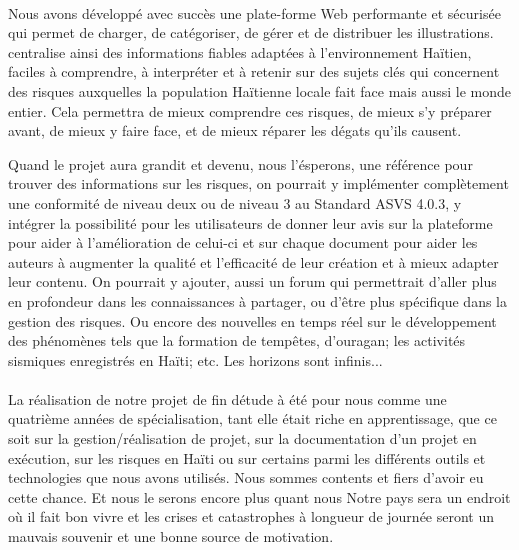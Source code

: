 	\paragraph{} Nous avons d\'evelopp\'e avec succ\`es une plate-forme Web performante et s\'ecuris\'ee qui permet de charger, de cat\'egoriser, de g\'erer et de distribuer les illustrations. \projectName centralise ainsi des informations fiables adapt\'ees \`a l'environnement Ha\"itien, faciles \`a comprendre, \`a interpr\'eter et \`a retenir sur des sujets cl\'es qui concernent des risques auxquelles la population Ha\"itienne locale fait face mais aussi le monde entier. Cela permettra de mieux comprendre ces risques, de mieux s'y pr\'eparer avant, de mieux y faire face, et de mieux r\'eparer les d\'egats qu'ils causent.\par
	\noindent Quand le projet aura grandit et devenu, nous l'\'esperons, une r\'ef\'erence pour trouver des informations sur les risques, on pourrait y impl\'ementer compl\`etement une conformit\'e de niveau deux ou de niveau 3 au Standard ASVS 4.0.3,  y int\'egrer la possibilit\'e pour les utilisateurs de donner leur avis sur la plateforme pour aider \`a l'am\'elioration de celui-ci et sur chaque document pour aider les auteurs \`a augmenter la qualit\'e et l'efficacit\'e de leur cr\'eation et \`a mieux adapter leur contenu. On pourrait y ajouter, aussi un forum qui permettrait d'aller plus en profondeur dans les connaissances \`a partager, ou d'\^etre plus sp\'ecifique dans la gestion des risques. Ou encore des nouvelles en temps r\'eel sur le d\'eveloppement des ph\'enom\`enes tels que la formation de temp\^etes, d'ouragan; les activit\'es sismiques enregistr\'es en Ha\"iti; etc. Les horizons sont infinis...
	\vspace{15pt}
	
	\paragraph{}La r\'ealisation de notre projet de fin d\'etude \`a \'et\'e pour nous comme une quatri\`eme ann\'ees de sp\'ecialisation, tant elle \'etait riche en apprentissage, que ce soit sur la gestion/r\'ealisation de projet, sur la documentation d'un projet en ex\'ecution, sur les risques en Ha\"iti ou sur certains parmi les diff\'erents outils et technologies que nous avons utilis\'es. Nous sommes contents et fiers d'avoir eu cette chance. Et nous le serons encore plus quant nous Notre pays sera un endroit o\`u il fait bon vivre et les crises et catastrophes \`a longueur de journ\'ee seront un mauvais souvenir et une bonne source de motivation. 